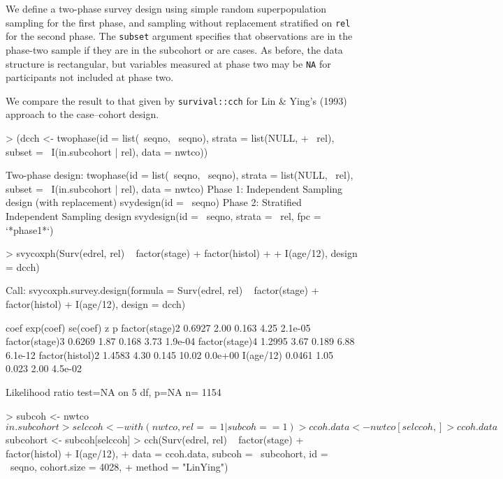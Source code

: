 \documentclass{article}
\begin{document}
We define a two-phase survey design using simple random
superpopulation sampling for the first phase, and sampling without
replacement stratified on \texttt{rel} for the second phase. The
\texttt{subset} argument specifies that observations are in the phase-two sample if they are in the subcohort or are cases.  As before, the data structure is rectangular, but variables measured at phase two may be \texttt{NA} for participants not included at phase two.

We compare the result to that given by \texttt{survival::cch} for Lin
\& Ying's (1993) approach to the case--cohort design.


\begin{Schunk}
\begin{Sinput}
> (dcch <- twophase(id = list(~seqno, ~seqno), strata = list(NULL, 
+     ~rel), subset = ~I(in.subcohort | rel), data = nwtco))
\end{Sinput}
\begin{Soutput}
Two-phase design: twophase(id = list(~seqno, ~seqno), strata = list(NULL, ~rel), 
    subset = ~I(in.subcohort | rel), data = nwtco)
Phase 1:
Independent Sampling design (with replacement)
svydesign(id = ~seqno)
Phase 2:
Stratified Independent Sampling design
svydesign(id = ~seqno, strata = ~rel, fpc = `*phase1*`)
\end{Soutput}
\begin{Sinput}
> svycoxph(Surv(edrel, rel) ~ factor(stage) + factor(histol) + 
+     I(age/12), design = dcch)
\end{Sinput}
\begin{Soutput}
Call:
svycoxph.survey.design(formula = Surv(edrel, rel) ~ factor(stage) + 
    factor(histol) + I(age/12), design = dcch)


                  coef exp(coef) se(coef)     z       p
factor(stage)2  0.6927      2.00    0.163  4.25 2.1e-05
factor(stage)3  0.6269      1.87    0.168  3.73 1.9e-04
factor(stage)4  1.2995      3.67    0.189  6.88 6.1e-12
factor(histol)2 1.4583      4.30    0.145 10.02 0.0e+00
I(age/12)       0.0461      1.05    0.023  2.00 4.5e-02

Likelihood ratio test=NA  on 5 df, p=NA  n= 1154 
\end{Soutput}
\begin{Sinput}
> subcoh <- nwtco$in.subcohort
> selccoh <- with(nwtco, rel == 1 | subcoh == 1)
> ccoh.data <- nwtco[selccoh, ]
> ccoh.data$subcohort <- subcoh[selccoh]
> cch(Surv(edrel, rel) ~ factor(stage) + factor(histol) + I(age/12), 
+     data = ccoh.data, subcoh = ~subcohort, id = ~seqno, cohort.size = 4028, 
+     method = "LinYing")
\end{Sinput}
\end{Schunk}
\end{document}
